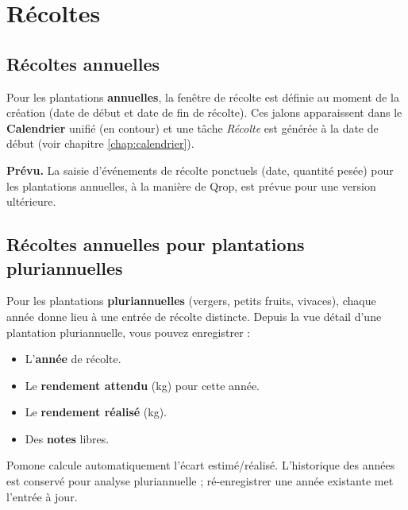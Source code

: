 \chapter{Récoltes}
\label{chap:recoltes}

\section{Récoltes annuelles}

Pour les plantations \textbf{annuelles}, la fenêtre de récolte est définie au moment de la création (date de début et date de fin de récolte). Ces jalons apparaissent dans le \textbf{Calendrier} unifié (en contour) et une tâche \emph{Récolte} est générée à la date de début (voir chapitre \ref{chap:calendrier}).

\begin{notebox}
\textbf{Prévu.} La saisie d'événements de récolte ponctuels (date, quantité pesée) pour les plantations annuelles, à la manière de Qrop, est prévue pour une version ultérieure.
\end{notebox}

\section{Récoltes annuelles pour plantations pluriannuelles}

Pour les plantations \textbf{pluriannuelles} (vergers, petits fruits, vivaces), chaque année donne lieu à une entrée de récolte distincte. Depuis la vue détail d'une plantation pluriannuelle, vous pouvez enregistrer :

\begin{itemize}
  \item L'\textbf{année} de récolte.
  \item Le \textbf{rendement attendu} (kg) pour cette année.
  \item Le \textbf{rendement réalisé} (kg).
  \item Des \textbf{notes} libres.
\end{itemize}

Pomone calcule automatiquement l'écart estimé/réalisé. L'historique des années est conservé pour analyse pluriannuelle ; ré-enregistrer une année existante met l'entrée à jour.

